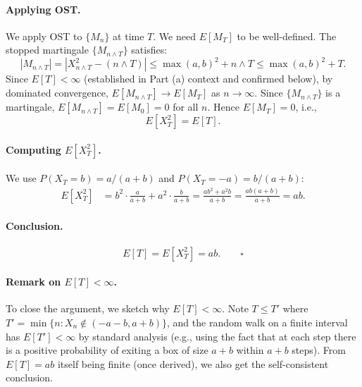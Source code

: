 \documentclass[11pt]{article}
\newcommand{\1}{\mathbf{1}}
\theoremstyle{plain}
\begin{document}
\paragraph{Applying OST.}
We apply OST to $\{M_n\}$ at time $T$. We need $E[M_T]$ to be well-defined.
The stopped martingale $\{M_{n\wedge T}\}$ satisfies:
\[
  |M_{n\wedge T}| = |X_{n\wedge T}^2-(n\wedge T)|
  \le \max(a,b)^2 + n\wedge T
  \le \max(a,b)^2 + T.
\]
Since $E[T]<\infty$ (established in Part (a) context and confirmed below), by
dominated convergence, $E[M_{n\wedge T}]\to E[M_T]$ as $n\to\infty$. Since
$\{M_{n\wedge T}\}$ is a martingale, $E[M_{n\wedge T}]=E[M_0]=0$ for all $n$.
Hence $E[M_T]=0$, i.e.,
\[
  E[X_T^2] = E[T].
\]

\paragraph{Computing $E[X_T^2]$.}
We use $P(X_T=b)=a/(a+b)$ and $P(X_T=-a)=b/(a+b)$:
\begin{align*}
  E[X_T^2]
  &= b^2\cdot\frac{a}{a+b} + a^2\cdot\frac{b}{a+b}
   = \frac{ab^2+a^2b}{a+b}
   = \frac{ab(a+b)}{a+b}
   = ab.
\end{align*}

\paragraph{Conclusion.}
\[
  E[T] = E[X_T^2] = ab.
  \qquad\square
\]

\paragraph{Remark on $E[T]<\infty$.}
To close the argument, we sketch why $E[T]<\infty$. Note $T\le T'$ where
$T'=\min\{n: X_n\notin(-a-b, a+b)\}$, and the random walk on a finite interval
has $E[T']<\infty$ by standard analysis (e.g., using the fact that at each step
there is a positive probability of exiting a box of size $a+b$ within $a+b$
steps). From $E[T]=ab$ itself being finite (once derived), we also get the
self-consistent conclusion.
\end{document}
